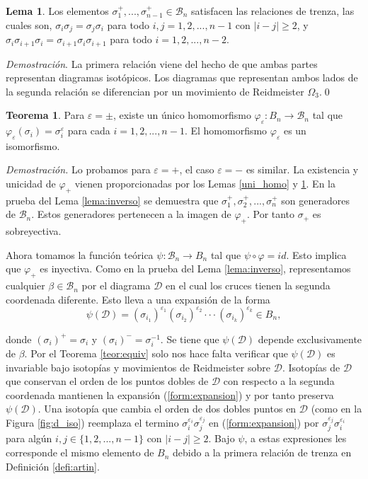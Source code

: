 \documentclass[12pt]{article}
\theoremstyle{definition}
\newtheorem{teor}{Teorema}[section]
\newtheorem{lema}{Lema}[section]
\begin{document}
\begin{lema}
Los elementos $\sigma_1^+,...,\sigma_{n-1}^+\in\mathcal{B}_n$ satisfacen las relaciones de trenza, las cuales son, $\sigma_i\sigma_j = \sigma_j\sigma_i$ para todo $i,j=1,2,...,n-1$ con $|i-j|\geq 2$, y $\sigma_i\sigma_{i+1}\sigma_i =\sigma_{i+1}\sigma_i\sigma_{i+1}$ para todo $i=1,2,...,n-2$.
\label{lema:rel_geom}
\end{lema}

\textit{Demostración}. La primera relación viene del hecho de que ambas partes representan diagramas isotópicos. Los diagramas que representan ambos lados de la segunda relación se diferencian por un movimiento de Reidmeister $\Omega_3$.\qed

\begin{teor}
Para $\varepsilon = \pm$, existe un único homomorfismo $\varphi_\varepsilon : B_n\rightarrow\mathcal{B}_n$ tal que $\varphi_\varepsilon(\sigma_i) = \sigma_i^\varepsilon$ para cada $i=1,2,...,n-1$. El homomorfismo $\varphi_\varepsilon$ es un isomorfismo.
\end{teor}

\textit{Demostración.} Lo probamos para $\varepsilon = +$, el caso $\varepsilon = -$ es similar. La existencia y unicidad de $\varphi_+$ vienen proporcionadas por los Lemas \ref{uni_homo} y \ref{lema:rel_geom}. En la prueba del Lema \ref{lema:inverso} se demuestra que $\sigma_1^+,\sigma_2^+,...,\sigma_n^+$ son generadores de $\mathcal{B}_n$. Estos generadores pertenecen a la imagen de $\varphi_+$. Por tanto $\sigma_+$ es sobreyectiva.

Ahora tomamos la función teórica $\psi :\mathcal{B}_n\rightarrow B_n$ tal que $\psi \circ \varphi = id$. Esto implica que $\varphi_+$ es inyectiva. Como en la prueba del Lema \ref{lema:inverso}, representamos cualquier $\beta\in\mathcal{B}_n$ por el diagrama $\mathcal{D}$ en el cual los cruces tienen la segunda coordenada diferente. Esto lleva a una expansión de la forma \label{hola}
\begin{equation}\label{form:expansion}
\psi(\mathcal{D})=(\sigma_{i_1})^{\varepsilon_1}(\sigma_{i_2})^{\varepsilon_2}\cdot\cdot\cdot(\sigma_{i_k})^{\varepsilon_k}\in B_n,
\end{equation}

donde $(\sigma_i)^+=\sigma_i$ y $(\sigma_i)^-=\sigma_i^{-1}$. Se tiene que $\psi(\mathcal{D})$ depende exclusivamente de $\beta$. Por el Teorema \ref{teor:equiv} solo nos hace falta verificar que $\psi(\mathcal{D})$ es invariable bajo isotopías y movimientos de Reidmeister sobre $\mathcal{D}$. Isotopías de $\mathcal{D}$ que conservan el orden de los puntos dobles de $\mathcal{D}$ con respecto a la segunda coordenada mantienen la expansión (\ref{form:expansion}) y por tanto preserva $\psi(\mathcal{D})$. Una isotopía que cambia el orden de dos dobles puntos en $\mathcal{D}$ (como en la Figura \ref{fig:d_iso}) reemplaza el termino $\sigma_i^{\varepsilon_i}\sigma_j^{\varepsilon_j}$ en (\ref{form:expansion}) por $\sigma_j^{\varepsilon_j}\sigma_i^{\varepsilon_i}$ para algún $i,j\in\{1,2,...,n-1\}$ con $|i-j|\geq 2$. Bajo $\psi$, a estas expresiones les corresponde el mismo elemento de $B_n$ debido a la primera relación de trenza en Definición
 \ref{defi:artin}.
\end{document}
